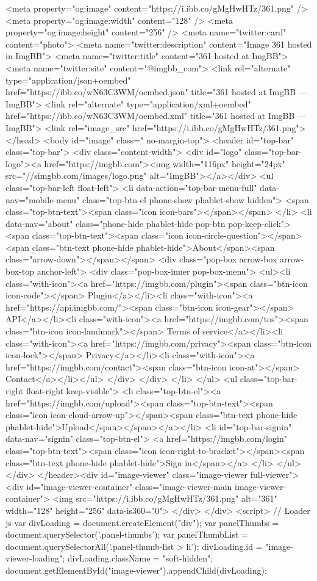 <meta property="og:image" content="https://i.ibb.co/gMgHwHTz/361.png" />
<meta property="og:image:width" content="128" />
<meta property="og:image:height" content="256" />
<meta name="twitter:card" content="photo">
<meta name="twitter:description" content="Image 361 hosted in ImgBB">
<meta name="twitter:title" content="361 hosted at ImgBB">
<meta name="twitter:site" content="@imgbb_com">
<link rel="alternate" type="application/json+oembed" href="https://ibb.co/wN63C3WM/oembed.json" title="361 hosted at ImgBB — ImgBB">
<link rel="alternate" type="application/xml+oembed" href="https://ibb.co/wN63C3WM/oembed.xml" title="361 hosted at ImgBB — ImgBB">
<link rel="image_src" href="https://i.ibb.co/gMgHwHTz/361.png">
</head>
<body id="image" class=" no-margin-top">
<header id="top-bar" class="top-bar">
<div class="content-width">
<div id="logo" class="top-bar-logo"><a href="https://imgbb.com"><img width="116px" height="24px" src="//simgbb.com/images/logo.png" alt="ImgBB"></a></div>
<ul class="top-bar-left float-left">
<li data-action="top-bar-menu-full" data-nav="mobile-menu" class="top-btn-el phone-show phablet-show hidden">
<span class="top-btn-text"><span class="icon icon-bars"></span></span>
</li>
<li data-nav="about" class="phone-hide phablet-hide pop-btn pop-keep-click">
<span class="top-btn-text"><span class="icon icon-circle-question"></span><span class="btn-text phone-hide phablet-hide">About</span><span class="arrow-down"></span></span>
<div class="pop-box arrow-box arrow-box-top anchor-left">
<div class="pop-box-inner pop-box-menu">
<ul><li class="with-icon"><a href="https://imgbb.com/plugin"><span class="btn-icon icon-code"></span> Plugin</a></li><li class="with-icon"><a href="https://api.imgbb.com/"><span class="btn-icon icon-gear"></span> API</a></li><li class="with-icon"><a href="https://imgbb.com/tos"><span class="btn-icon icon-landmark"></span> Terms of service</a></li><li class="with-icon"><a href="https://imgbb.com/privacy"><span class="btn-icon icon-lock"></span> Privacy</a></li><li class="with-icon"><a href="https://imgbb.com/contact"><span class="btn-icon icon-at"></span> Contact</a></li></ul>
</div>
</div>
</li>
</ul>
<ul class="top-bar-right float-right keep-visible">
<li class="top-btn-el"><a href="https://imgbb.com/upload"><span class="top-btn-text"><span class="icon icon-cloud-arrow-up"></span><span class="btn-text phone-hide phablet-hide">Upload</span></span></a></li>
<li id="top-bar-signin" data-nav="signin" class="top-btn-el">
<a href="https://imgbb.com/login" class="top-btn-text"><span class="icon icon-right-to-bracket"></span><span class="btn-text phone-hide phablet-hide">Sign in</span></a>
</li>
</ul>
</div>
</header><div id="image-viewer" class="image-viewer full-viewer">
<div id="image-viewer-container" class="image-viewer-main image-viewer-container">
<img src="https://i.ibb.co/gMgHwHTz/361.png" alt="361" width="128" height="256" data-is360="0">
</div>
</div>
<script>
// Loader js
var divLoading = document.createElement("div");
var panelThumbs = document.querySelector('.panel-thumbs');
var panelThumbList = document.querySelectorAll('.panel-thumb-list > li');
divLoading.id = "image-viewer-loading";
divLoading.className = "soft-hidden";
document.getElementById("image-viewer").appendChild(divLoading);


